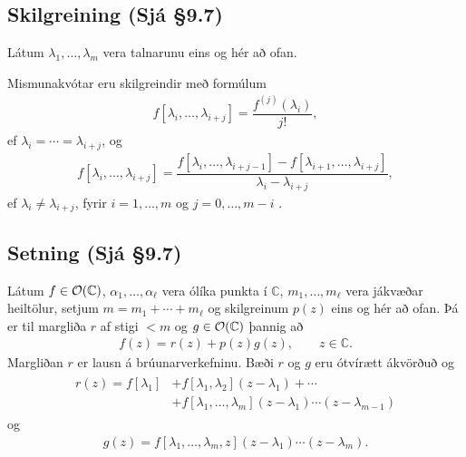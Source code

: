 \documentclass[a4paper,10pt,icelandic]{sphinxmanual}
\begin{document}
\subsection{Skilgreining (Sjá \S{}9.7)}
\label{\detokenize{Kafli09:id6}}
Látum \(\lambda_1,\dots,\lambda_m\) vera talnarunu eins og hér að ofan.

Mismunakvótar eru skilgreindir með formúlum
\begin{equation*}
\begin{split}f[\lambda_i,\dots,\lambda_{i+j}]=\dfrac{f^{(j)}(\lambda_i)}{j!},\end{split}
\end{equation*}
ef \(\lambda_i=\cdots=\lambda_{i+j}\), og
\begin{equation*}
\begin{split}f[\lambda_i,\dots,\lambda_{i+j}]=
\dfrac{f[\lambda_i,\dots,\lambda_{i+j-1}]-f[\lambda_{i+1},\dots,\lambda_{i+j}]}
{\lambda_i-\lambda_{i+j}},\end{split}
\end{equation*}
ef \(\lambda_i\neq \lambda_{i+j}\), fyrir \(i=1,\dots,m\) og \(j=0,\dots,m-i\) .


\subsection{Setning (Sjá \S{}9.7)}
\label{\detokenize{Kafli09:setning-sja-9-7}}
Látum \(f\in {\cal O}({\mathbb{C}})\), \(\alpha_1,\dots,\alpha_\ell\) vera ólíka punkta í \({\mathbb{C}}\), \(m_1,\dots,m_\ell\) vera jákvæðar heiltölur, setjum \(m=m_1+\cdots+m_\ell\) og skilgreinum \(p(z)\) eins og hér að ofan. Þá er til margliða \(r\) af stigi \(<m\) og \(g\in {\cal O}({\mathbb{C}})\) þannig að
\begin{equation*}
\begin{split}f(z)=r(z)+p(z)g(z), \qquad z\in {\mathbb{C}}.\end{split}
\end{equation*}
Margliðan \(r\) er lausn á brúunarverkefninu. Bæði \(r\) og \(g\) eru ótvírætt ákvörðuð og
\begin{equation*}
\begin{split}\begin{aligned}
r(z)=f[\lambda_1]&+f[\lambda_1,\lambda_2](z-\lambda_1)+\cdots\\
&+ f[\lambda_1,\dots,\lambda_m](z-\lambda_1)\cdots(z-\lambda_{m-1})\end{aligned}\end{split}
\end{equation*}
og
\begin{equation*}
\begin{split}g(z)=f[\lambda_1,\dots,\lambda_m,z](z-\lambda_1)\cdots(z-\lambda_m).\end{split}
\end{equation*}
\end{document}
